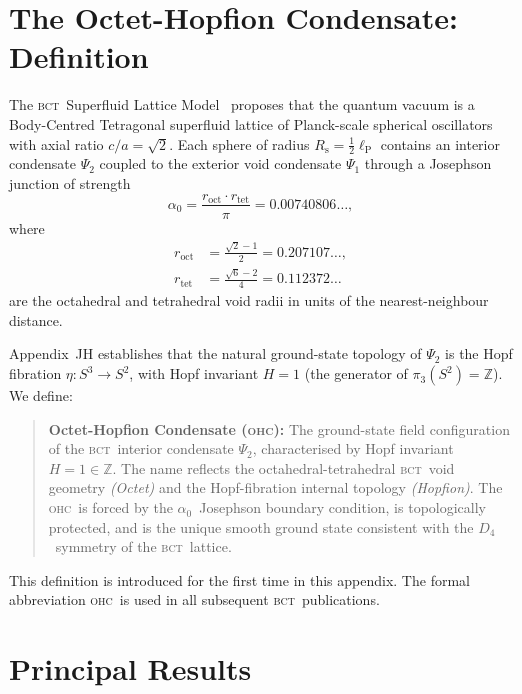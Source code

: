 \documentclass[aps,prl,twocolumn,superscriptaddress,floatfix]{revtex4-2}
\newcommand{\roct}{r_{\mathrm{oct}}}
\newcommand{\rtet}{r_{\mathrm{tet}}}
\newcommand{\az}{\alpha_0}
\newcommand{\lP}{\ell_{\mathrm{P}}}
\newcommand{\BCT}{\textsc{bct}}
\newcommand{\OHC}{\textsc{ohc}}
\newcommand{\Psiint}{\Psi_2}
\newcommand{\Psiext}{\Psi_1}
\newcommand{\HopfN}{H}
\newcommand{\Rsph}{R_{\mathrm{s}}}
\begin{document}
\section{The Octet-Hopfion Condensate: Definition}
\label{sec:ohc}

The \BCT\ Superfluid Lattice Model~\cite{Monograph} proposes that the
quantum vacuum is a Body-Centred Tetragonal superfluid lattice of
Planck-scale spherical oscillators with axial ratio $c/a=\sqrt{2}$.
Each sphere of radius $\Rsph = \tfrac{1}{2}\lP$ contains an interior
condensate $\Psiint$ coupled to the exterior void condensate $\Psiext$
through a Josephson junction of strength
\begin{equation}
  \az = \frac{\roct\cdot\rtet}{\pi} = 0.00740806\ldots,
  \label{eq:alpha0}
\end{equation}
where
\begin{align}
  \roct &= \tfrac{\sqrt{2}-1}{2} = 0.207107\ldots, \nonumber\\
  \rtet &= \tfrac{\sqrt{6}-2}{4} = 0.112372\ldots
  \label{eq:radii}
\end{align}
are the octahedral and tetrahedral void radii in units of the
nearest-neighbour distance.

Appendix~JH establishes that the natural ground-state topology of
$\Psiint$ is the Hopf fibration $\eta: S^3\to S^2$, with Hopf invariant
$\HopfN=1$ (the generator of $\pi_3(S^2)=\mathbb{Z}$).
We define:

\begin{quote}
\textbf{Octet-Hopfion Condensate (\OHC):}
The ground-state field configuration of the \BCT\ interior condensate
$\Psiint$, characterised by Hopf invariant $\HopfN=1\in\mathbb{Z}$.
The name reflects the octahedral-tetrahedral \BCT\ void geometry
\emph{(Octet)} and the Hopf-fibration internal topology
\emph{(Hopfion)}.
The \OHC\ is forced by the $\az$~Josephson boundary condition, is
topologically protected, and is the unique smooth ground state consistent
with the $D_4$~symmetry of the \BCT\ lattice.
\end{quote}

This definition is introduced for the first time in this appendix.
The formal abbreviation \OHC\ is used in all subsequent \BCT\
publications.

\section{Principal Results}
\label{sec:results}
\end{document}
